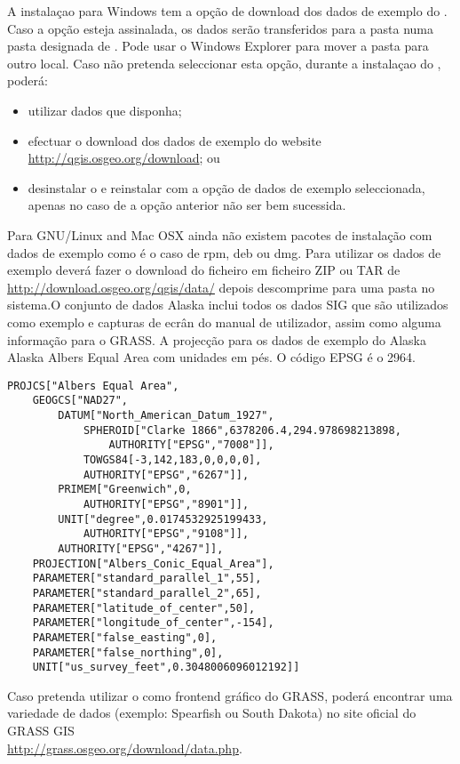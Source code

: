 \win A instalaçao para Windows tem a opção de download dos dados de exemplo do \qg.
Caso a opção esteja assinalada, os dados serão transferidos para a pasta 
numa pasta designada de . 
Pode usar o Windows Explorer para mover a pasta para outro local.
Caso não pretenda seleccionar esta opção, 
durante a instalaçao do \qg, poderá:
\begin{itemize}[label=--]
\item utilizar dados que disponha;
\item efectuar o download dos dados de exemplo do website \url{http://qgis.osgeo.org/download}; ou
\item desinstalar o \qg e reinstalar com a opção de dados de exemplo seleccionada, apenas no caso de 
a opção anterior não ser bem sucessida.
\end{itemize}

\nix \osx Para GNU/Linux and Mac OSX ainda não existem pacotes de instalação com dados
de exemplo como é o caso de rpm, deb ou dmg. Para utilizar os dados de exemplo deverá fazer o download 
do ficheiro  em ficheiro ZIP ou TAR  de
\url{http://download.osgeo.org/qgis/data/} depois descomprime para uma pasta no
sistema.O conjunto de dados Alaska inclui todos os dados SIG que são utilizados como
exemplo e capturas de ecrân do manual de utilizador, assim como alguma informação para o GRASS.
A projecção para os dados de exemplo do Alaska Alaska Albers Equal
Area com unidades em pés. O código EPSG é o 2964.

\begin{verbatim}
PROJCS["Albers Equal Area",
    GEOGCS["NAD27",
        DATUM["North_American_Datum_1927",
            SPHEROID["Clarke 1866",6378206.4,294.978698213898,
                AUTHORITY["EPSG","7008"]],
            TOWGS84[-3,142,183,0,0,0,0],
            AUTHORITY["EPSG","6267"]],
        PRIMEM["Greenwich",0,
            AUTHORITY["EPSG","8901"]],
        UNIT["degree",0.0174532925199433,
            AUTHORITY["EPSG","9108"]],
        AUTHORITY["EPSG","4267"]],
    PROJECTION["Albers_Conic_Equal_Area"],
    PARAMETER["standard_parallel_1",55],
    PARAMETER["standard_parallel_2",65],
    PARAMETER["latitude_of_center",50],
    PARAMETER["longitude_of_center",-154],
    PARAMETER["false_easting",0],
    PARAMETER["false_northing",0],
    UNIT["us_survey_feet",0.3048006096012192]]
\end{verbatim}

Caso pretenda utilizar o \qg como frontend gráfico do GRASS, poderá encontrar
uma variedade de dados (exemplo: Spearfish ou South Dakota) no site oficial do
GRASS GIS \\
\url{http://grass.osgeo.org/download/data.php}. 

